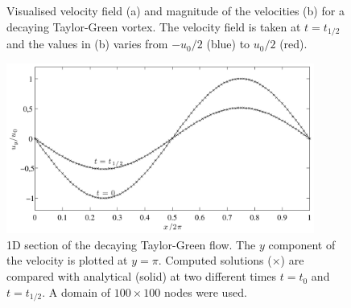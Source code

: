 \begin{figure}
  \centering
  \hspace{5pt} 
  \caption{Visualised velocity field (a) and magnitude of the
    velocities (b) for a decaying Taylor-Green vortex. The velocity
    field is taken at $t=t_{1/2}$ and the values in (b) varies from
    $-u_0/2$ (blue) to $u_0/2$ (red).}
  \label{fig:mb:taylor_vis}
\end{figure}

\begin{figure}
\begin{center}
\includegraphics[width=0.9\textwidth]{fig/taylor_uy.pdf}
\end{center}
\caption{1D section of the decaying Taylor-Green flow. The $y$
  component of the velocity is plotted at $y = \pi$. Computed solutions
  ($\times$) are compared with analytical (solid) at two different
  times $t = t_0$ and $t = t_{1/2}$. A domain of $100\times100$ nodes
  were used.}
\label{fig:mb:tg_uy}
\end{figure}

